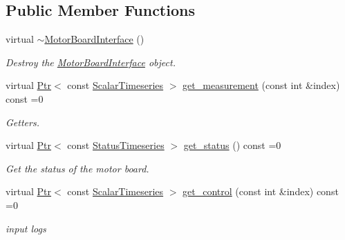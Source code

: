 \subsection*{Public Member Functions}
\begin{DoxyCompactItemize}
\item 
virtual \hyperlink{classblmc__drivers_1_1MotorBoardInterface_aecd23682c4a8c0df8e57b4c752e1d9ee}{$\sim$\+Motor\+Board\+Interface} ()\hypertarget{classblmc__drivers_1_1MotorBoardInterface_aecd23682c4a8c0df8e57b4c752e1d9ee}{}\label{classblmc__drivers_1_1MotorBoardInterface_aecd23682c4a8c0df8e57b4c752e1d9ee}

\begin{DoxyCompactList}\small\item\em Destroy the \hyperlink{classblmc__drivers_1_1MotorBoardInterface}{Motor\+Board\+Interface} object. \end{DoxyCompactList}\item 
virtual \hyperlink{classblmc__drivers_1_1MotorBoardInterface_a6a733b7ed7a3a96f6b0712b6bb5307f8}{Ptr}$<$ const \hyperlink{classblmc__drivers_1_1MotorBoardInterface_a14e237254ba495a66091ea3a3a33fa75}{Scalar\+Timeseries} $>$ \hyperlink{classblmc__drivers_1_1MotorBoardInterface_a34828a0375a3bd1fede4deb4fc74c04d}{get\+\_\+measurement} (const int \&index) const =0
\begin{DoxyCompactList}\small\item\em Getters. \end{DoxyCompactList}\item 
virtual \hyperlink{classblmc__drivers_1_1MotorBoardInterface_a6a733b7ed7a3a96f6b0712b6bb5307f8}{Ptr}$<$ const \hyperlink{classblmc__drivers_1_1MotorBoardInterface_ae3777e484dda60c4abe87f2b542ddfb8}{Status\+Timeseries} $>$ \hyperlink{classblmc__drivers_1_1MotorBoardInterface_a13b1ffa7d10c1c753d76eaf5368714e3}{get\+\_\+status} () const =0
\begin{DoxyCompactList}\small\item\em Get the status of the motor board. \end{DoxyCompactList}\item 
virtual \hyperlink{classblmc__drivers_1_1MotorBoardInterface_a6a733b7ed7a3a96f6b0712b6bb5307f8}{Ptr}$<$ const \hyperlink{classblmc__drivers_1_1MotorBoardInterface_a14e237254ba495a66091ea3a3a33fa75}{Scalar\+Timeseries} $>$ \hyperlink{classblmc__drivers_1_1MotorBoardInterface_aa5eeed12c851993f2e2c93f5479df9de}{get\+\_\+control} (const int \&index) const =0
\begin{DoxyCompactList}\small\item\em input logs \end{DoxyCompactList}\item 

\end{DoxyCompactItemize}
